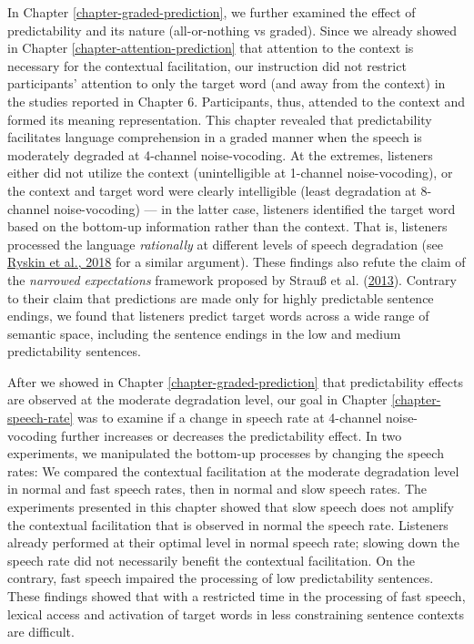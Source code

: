 \documentclass[a4paper, nobind]{templates/ociamthesis}
\begin{document}
In Chapter \ref{chapter-graded-prediction}, we further examined the effect of predictability and its nature (all-or-nothing vs graded).
Since we already showed in Chapter \ref{chapter-attention-prediction} that attention to the context is necessary for the contextual facilitation,
our instruction did not restrict participants' attention to only the target word (and away from the context) in the studies reported in Chapter 6.
Participants, thus, attended to the context and formed its meaning representation.
This chapter revealed that predictability facilitates language comprehension in a graded manner when the speech is moderately degraded at 4-channel noise-vocoding.
At the extremes, listeners either did not utilize the context (unintelligible at 1-channel noise-vocoding),
or the context and target word were clearly intelligible (least degradation at 8-channel noise-vocoding) ---
in the latter case, listeners identified the target word based on the bottom-up information rather than the context.
That is, listeners processed the language \emph{rationally} at different levels of speech degradation (see \protect\hyperlink{ref-Ryskin2018}{Ryskin et al., 2018} for a similar argument).
These findings also refute the claim of the \emph{narrowed expectations} framework proposed by Strauß et al. (\protect\hyperlink{ref-Strauss2013}{2013}).
Contrary to their claim that predictions are made only for highly predictable sentence endings,
we found that listeners predict target words across a wide range of semantic space, including the sentence endings in the low and medium predictability sentences.

After we showed in Chapter \ref{chapter-graded-prediction} that predictability effects are observed at the moderate degradation level,
our goal in Chapter \ref{chapter-speech-rate} was to examine if a change in speech rate at 4-channel noise-vocoding
further increases or decreases the predictability effect.
In two experiments, we manipulated the bottom-up processes by changing the speech rates:
We compared the contextual facilitation at the moderate degradation level in normal and fast speech rates,
then in normal and slow speech rates.
The experiments presented in this chapter showed that slow speech does not amplify the contextual facilitation that is observed in normal the speech rate.
Listeners already performed at their optimal level in normal speech rate;
slowing down the speech rate did not necessarily benefit the contextual facilitation.
On the contrary, fast speech impaired the processing of low predictability sentences.
These findings showed that with a restricted time in the processing of fast speech,
lexical access and activation of target words in less constraining sentence contexts are difficult.
\end{document}
